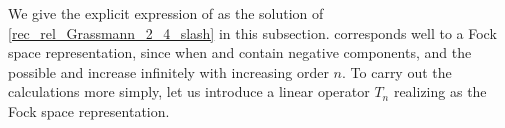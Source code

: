 \documentclass[10pt,a4paper]{amsart}
\numberwithin{equation}{section}
\begin{document}
We give the explicit expression of  as the solution of \eqref{rec_rel_Grassmann_2_4_slash} in this subsection.
corresponds
well to a Fock space representation,
since
when  and  contain negative components, and the possible  and  increase infinitely with increasing order $n$. To carry out the calculations more simply, let us introduce a linear operator $T_{n}$
realizing  as the Fock space representation.
\end{document}
